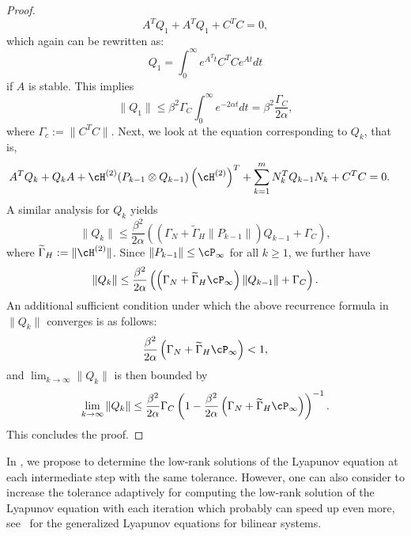 \begin{proof}
	\begin{equation*}
	A^TQ_1 + A^TQ_1 + C^TC = 0,
	\end{equation*}
which again can be rewritten as:
	\begin{equation*}
	Q_1 = \int_0^\infty e^{A^Tt}C^TCe^{At}dt
	\end{equation*}
if $A$ is stable. This	implies 
	\begin{equation*}
	\|Q_1\| \leq \beta^2\Gamma_C  \int_0^\infty e^{-2\alpha t}dt = \beta^2 \dfrac{\Gamma_C}{2\alpha},
	\end{equation*}
where $\Gamma_c := \|C^TC\|$.	Next, we look at the equation corresponding to $Q_k$, that is,
	\begin{align*}
	A^TQ_k + Q_kA + \cH^{(2)}(P_{k-1} \otimes Q_{k-1})\left(\cH^{(2)}\right)^T + \sum_{k=1}^mN_k^TQ_{k-1}N_k + C^TC&=0. 
	\end{align*}
A similar analysis for $Q_k$  yields
\begin{equation*}
\|Q_k\| \leq \dfrac{\beta^2}{2\alpha}\left( \left(\Gamma_N + \tilde\Gamma_H \|P_{k-1}\| \right)Q_{k-1} + \Gamma_C \right),
\end{equation*}
where $\tilde{\Gamma}_H := \|\cH^{(2)}\|$. Since $\|P_{k-1}\| \leq \cP_\infty$ for all $k\geq 1$, we further have
\begin{equation*}
\|Q_k\| \leq \dfrac{\beta^2}{2\alpha}\left( \left(\Gamma_N + \tilde\Gamma_H \cP_\infty \right)\|Q_{k-1}\| + \Gamma_C \right).
\end{equation*}
An additional sufficient condition under which the above recurrence formula in $\|Q_{k}\|$  converges is as follows:
		\begin{equation*}
\dfrac{\beta^2}{2\alpha}	\left(\Gamma_N + \tilde\Gamma_H \cP_\infty \right)< 1,
		\end{equation*}
		and $\lim_{k\rightarrow \infty}\|Q_k\|$ is then bounded by 
		\begin{equation*}
				\lim_{k\rightarrow \infty}\|Q_k\| \leq \dfrac{\beta^2}{2\alpha}\Gamma_C \left(1-\dfrac{\beta^2}{2\alpha}	\left(\Gamma_N + \tilde\Gamma_H \cP_\infty \right)\right)^{-1}.
		\end{equation*}
		This concludes the proof.
	\end{proof}
\begin{remark}
In , we propose to determine the low-rank solutions of the Lyapunov equation  at each intermediate step with the same tolerance. However, one can also consider to  increase the tolerance adaptively for computing the low-rank  solution of the Lyapunov equation  with each  iteration which probably can speed up even more, see~\cite{shank2014efficient} for the generalized Lyapunov equations for bilinear systems.  
\end{remark}

